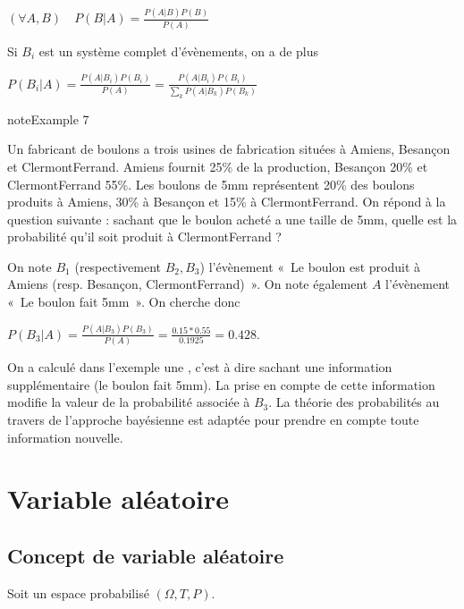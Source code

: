 \documentclass[letterpaper,10pt,french]{sphinxmanual}
\begin{document}
\sphinxAtStartPar
\((\forall A,B)\quad P(B|A)=\frac{P(A|B)P(B)}{P(A)}\)

\sphinxAtStartPar
Si \(B_i\) est un système complet d’évènements, on a de plus

\sphinxAtStartPar
\(P(B_i|A)= \frac{P(A|B_i)P(B_i)}{P(A)} = \frac{P(A|B_i)P(B_i)}{\displaystyle\sum_k P(A|B_k)P(B_k)}\)
\label{Rappels:example-17}
\begin{sphinxadmonition}{note}{Example 7}



\sphinxAtStartPar
Un fabricant de boulons a trois usines de fabrication situées à Amiens, Besançon et Clermont\sphinxhyphen{}Ferrand. Amiens fournit 25\% de la production, Besançon 20\% et Clermont\sphinxhyphen{}Ferrand 55\%. Les boulons de 5mm représentent 20\% des boulons produits à Amiens, 30\% à Besançon et 15\% à Clermont\sphinxhyphen{}Ferrand. On répond à la question suivante : sachant que le boulon acheté a une taille de 5mm, quelle est la probabilité qu’il soit produit à Clermont\sphinxhyphen{}Ferrand ?

\sphinxAtStartPar
On note \(B_1\) (respectivement \(B_2,B_3\)) l’évènement « Le boulon est produit à Amiens (resp. Besançon, Clermont\sphinxhyphen{}Ferrand) ». On note également \(A\) l’évènement « Le boulon fait 5mm ». On cherche donc

\sphinxAtStartPar
\(P(B_3|A) = \frac{P(A|B_3)P(B_3)}{P(A)}= \frac{0.15*0.55}{0.1925}=0.428\).
\end{sphinxadmonition}

\sphinxAtStartPar
On a calculé dans l’exemple une , c’est à dire sachant une information supplémentaire (le boulon fait 5mm). La prise en compte de cette information modifie la valeur de la probabilité associée à \(B_3\). La théorie des probabilités au travers de l’approche bayésienne est adaptée pour prendre en compte toute information nouvelle.


\section{Variable aléatoire}
\label{\detokenize{Rappels:variable-aleatoire}}

\subsection{Concept de variable aléatoire}
\label{\detokenize{Rappels:concept-de-variable-aleatoire}}
\sphinxAtStartPar
Soit un espace probabilisé \((\Omega, T,P)\).
\end{document}
